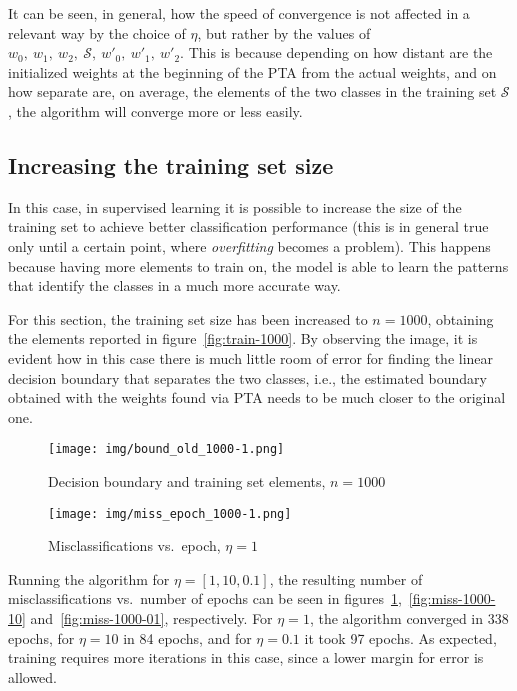 \documentclass[12pt]{article}
\begin{document}
It can be seen, in general, how the speed of convergence is not affected in a relevant way by the choice of $\eta$, but rather by the values of $w_0,\ w_1,\ w_2,\ \mathcal{S},\ w'_0,\ w'_1,\ w'_2$.
This is because depending on how distant are the initialized weights at the beginning of the PTA from the actual weights, and on how separate are, on average, the elements of the two classes in the training set $\mathcal{S}$, the algorithm will converge more or less easily.

\subsection{Increasing the training set size}

In this case, in supervised learning it is possible to increase the size of the training set to achieve better classification performance (this is in general true only until a certain point, where \textit{overfitting} becomes a problem).
This happens because having more elements to train on, the model is able to learn the patterns that identify the classes in a much more accurate way.

For this section, the training set size has been increased to $n=1000$, obtaining the elements reported in figure~\ref{fig:train-1000}.
By observing the image, it is evident how in this case there is much little room of error for finding the linear decision boundary that separates the two classes, i.e., the estimated boundary obtained with the weights found via PTA needs to be much closer to the original one.

\begin{figure} [h]
    \begin{minipage}{0.45\linewidth}
    \centering
        \texttt{[image: img/bound\_old\_1000-1.png]}
        \caption{Decision boundary and training set elements, $n=1000$}
        \label{fig:train-1000}
    \end{minipage}
    \hspace{0.5cm}
    \begin{minipage}{0.45\linewidth}
    \centering
        \texttt{[image: img/miss\_epoch\_1000-1.png]}
        \caption{Misclassifications vs.\ epoch, $\eta=1$}
        \label{fig:miss-1000-1}
    \end{minipage}
\end{figure}

Running the algorithm for $\eta = [1, 10, 0.1]$, the resulting number of misclassifications vs.\ number of epochs can be seen in figures~\ref{fig:miss-1000-1},~\ref{fig:miss-1000-10} and~\ref{fig:miss-1000-01}, respectively.
For $\eta=1$, the algorithm converged in 338 epochs, for $\eta=10$ in 84 epochs, and for $\eta=0.1$ it took 97 epochs.
As expected, training requires more iterations in this case, since a lower margin for error is allowed.\\
\end{document}
